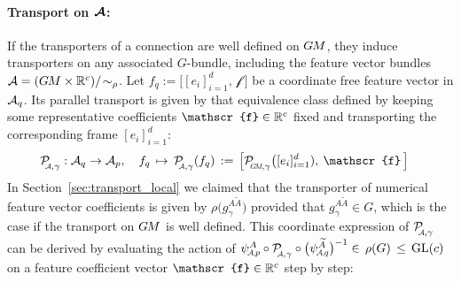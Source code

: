 \paragraph{Transport on $\boldsymbol{\mathcal{A}}$:}
If the transporters of a connection are well defined on $G\mkern-1.4muM$, they induce transporters on any associated $G$-bundle, including the feature vector bundles $\mathcal{A}=(G\mkern-1.4muM\times\mathbb{R}^c)/\!\sim_\rho$.
Let $f_q := \big[[e_i]_{i=1}^d,\,\mathscr{f}\:\!\big]$ be a coordinate free feature vector in $\mathcal{A}_q$.
Its parallel transport is given by that equivalence class defined by keeping some representative coefficients $\mathscr{f}\in \R^c$ fixed and transporting the corresponding frame $[e_i]_{i=1}^d$:
\begin{align}\label{eq:transporter_A_def}
    \PAgamma: \A_q &\to \A_p, \quad
    f_q \,\mapsto\, \PAgamma(f_q) \,:=\, \pig[\PGMgamma\big([e_i]_{i=1}^d),\: \mathscr{f} \,\pig]
\end{align}
In Section~\ref{sec:transport_local} we claimed that the transporter of numerical feature vector coefficients is given by $\rho\big(g_\gamma^{A\widetilde{A}}\big)$ provided that $g_\gamma^{A\widetilde{A}}\in G$, which is the case if the transport on $G\mkern-1.4muM$ is well defined.
This coordinate expression of $\PAgamma$ can be derived by evaluating the action of
$\psiAp^A \circ \PAgamma \circ \big(\psiAq^{\widetilde{A}}\big)^{-1} \in\, \rho(G)\, \leq\, \GL{c}$
on a feature coefficient vector $\mathscr{f}\in\R^c$ step by step:

